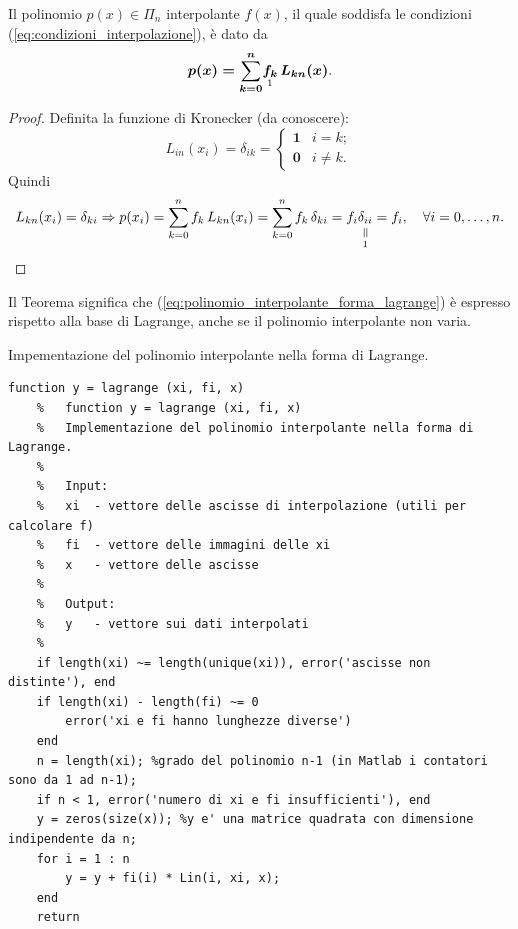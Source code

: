 \begin{theorem}
    Il polinomio $p(x)\in \Pi_n$ interpolante $f(x)$, il quale soddisfa le condizioni (\ref{eq:condizioni_interpolazione}), è dato da 
    \begin{equation}\label{eq:polinomio_interpolante_forma_lagrange}
        \boldsymbol{p(x)=\sum_{k=0}^{n}} \underset{\footnotemark}{\boldsymbol{f_k}}\, \boldsymbol{L_{kn}(x)}.
    \end{equation}
\end{theorem}
\begin{proof}
    Definita la funzione di Kronecker (da conoscere): 
    \begin{equation}\label{eq:formaKronecker}
        L_{in}(x_i)=\delta_{ik} = 
        \begin{cases}
            \boldsymbol 1 & i=k;\\
            \boldsymbol 0 & i\neq k.
        \end{cases}
    \end{equation}
   Quindi
   \begin{equation*}
       L_{kn}(x_i)=\delta_{ki}\Rightarrow p(x_i)=\sum_{k=0}^n f_k\, L_{kn}(x_i) = \sum_{k=0}^n f_k\, \delta_{ki} = f_i \equalto{\delta_{ii}}{1} = f_i,\quad \forall i=0,\hdots,n.
   \end{equation*}
\end{proof}

Il Teorema  significa che (\ref{eq:polinomio_interpolante_forma_lagrange}) è espresso rispetto alla base di Lagrange, anche se il polinomio interpolante non varia.

\begin{algorithm}
\caption{Impementazione del polinomio interpolante nella forma di Lagrange.}\label{alg:calcolo_polinomio_interpolante_forma_lagrange}
    \begin{lstlisting}[style=Matlab-editor]
    function y = lagrange (xi, fi, x)
    %   function y = lagrange (xi, fi, x)
    %   Implementazione del polinomio interpolante nella forma di Lagrange.
    %
    %   Input:
    %   xi  - vettore delle ascisse di interpolazione (utili per calcolare f)
    %   fi  - vettore delle immagini delle xi
    %   x   - vettore delle ascisse
    %
    %   Output:
    %   y   - vettore sui dati interpolati
    %
    if length(xi) ~= length(unique(xi)), error('ascisse non distinte'), end
    if length(xi) - length(fi) ~= 0
        error('xi e fi hanno lunghezze diverse')
    end
    n = length(xi); %grado del polinomio n-1 (in Matlab i contatori sono da 1 ad n-1);
    if n < 1, error('numero di xi e fi insufficienti'), end 
    y = zeros(size(x)); %y e' una matrice quadrata con dimensione indipendente da n;
    for i = 1 : n
        y = y + fi(i) * Lin(i, xi, x);
    end
    return
    \end{lstlisting}
\end{algorithm}

